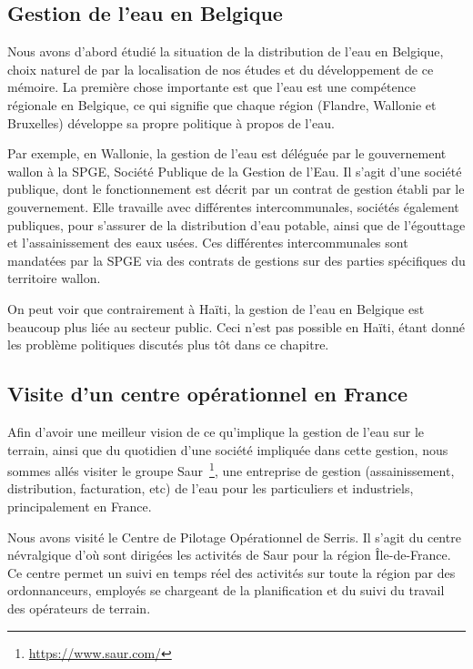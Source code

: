 \documentclass{EPL-master-thesis-covers-FR}
\begin{document}
			\subsection*{Gestion de l'eau en Belgique}

				Nous avons d'abord étudié la situation de la distribution de l'eau en Belgique, choix naturel de par la localisation de nos études et du développement de ce mémoire. La première chose importante est que l'eau est une compétence régionale en Belgique, ce qui signifie que chaque région (Flandre, Wallonie et Bruxelles) développe sa propre politique à propos de l'eau.

				Par exemple, en Wallonie, la gestion de l'eau est déléguée par le gouvernement wallon à la SPGE, Société Publique de la Gestion de l'Eau. Il s'agit d'une société publique, dont le fonctionnement est décrit par un contrat de gestion établi par le gouvernement. Elle travaille avec différentes intercommunales, sociétés également publiques, pour s'assurer de la distribution d'eau potable, ainsi que de l'égouttage et l'assainissement des eaux usées. Ces différentes intercommunales sont mandatées par la SPGE via des contrats de gestions sur des parties spécifiques du territoire wallon.


				On peut voir que contrairement à Haïti, la gestion de l'eau en Belgique est beaucoup plus liée au secteur public. Ceci n'est pas possible en Haïti, étant donné les problème politiques discutés plus tôt dans ce chapitre.

			\subsection*{Visite d'un centre opérationnel en France}

				Afin d'avoir une meilleur vision de ce qu'implique la gestion de l'eau sur le terrain, ainsi que du quotidien d'une société impliquée dans cette gestion, nous sommes allés visiter le groupe Saur~\footnote{\url{https://www.saur.com/}}, une entreprise de gestion (assainissement, distribution, facturation, etc) de l'eau pour les particuliers et industriels, principalement en France.

				Nous avons visité le Centre de Pilotage Opérationnel de Serris. Il s'agit du centre névralgique d'où sont dirigées les activités de Saur pour la région Île-de-France. Ce centre permet un suivi en temps réel des activités sur toute la région par des ordonnanceurs, employés se chargeant de la planification et du suivi du travail des opérateurs de terrain.
\end{document}
